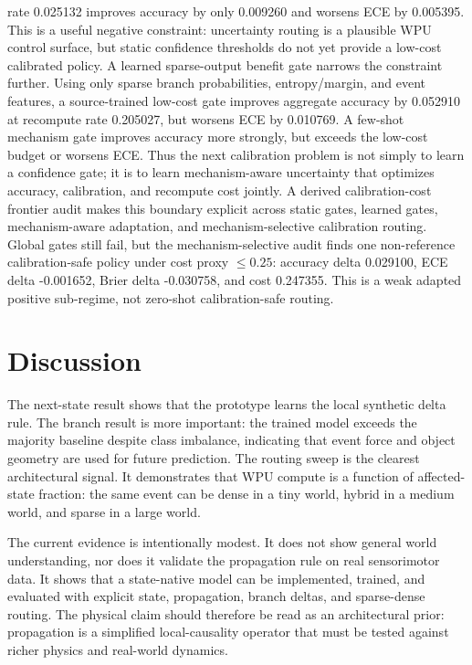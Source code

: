 \documentclass[11pt]{article}
\begin{document}
rate 0.025132 improves accuracy by only 0.009260 and worsens ECE by 0.005395.
This is a useful negative constraint: uncertainty routing is a plausible WPU
control surface, but static confidence thresholds do not yet provide a
low-cost calibrated policy.
A learned sparse-output benefit gate narrows the constraint further. Using only
sparse branch probabilities, entropy/margin, and event features, a source-trained
low-cost gate improves aggregate accuracy by 0.052910 at recompute rate
0.205027, but worsens ECE by 0.010769. A few-shot mechanism gate improves
accuracy more strongly, but exceeds the low-cost budget or worsens ECE. Thus the
next calibration problem is not simply to learn a confidence gate; it is to learn
mechanism-aware uncertainty that optimizes accuracy, calibration, and recompute
cost jointly.
A derived calibration-cost frontier audit makes this boundary explicit across
static gates, learned gates, mechanism-aware adaptation, and mechanism-selective
calibration routing. Global gates still fail, but the mechanism-selective audit
finds one non-reference calibration-safe policy under cost proxy $\leq 0.25$:
accuracy delta 0.029100, ECE delta -0.001652, Brier delta -0.030758, and cost
0.247355. This is a weak adapted positive sub-regime, not zero-shot
calibration-safe routing.

\section{Discussion}

The next-state result shows that the prototype learns the local synthetic delta
rule. The branch result is more important: the trained model exceeds the
majority baseline despite class imbalance, indicating that event force and
object geometry are used for future prediction. The routing sweep is the
clearest architectural signal. It demonstrates that WPU compute is a function of
affected-state fraction: the same event can be dense in a tiny world, hybrid in
a medium world, and sparse in a large world.

The current evidence is intentionally modest. It does not show general world
understanding, nor does it validate the propagation rule on real sensorimotor
data. It shows that a state-native model can be implemented, trained, and
evaluated with explicit state, propagation, branch deltas, and sparse-dense
routing. The physical claim should therefore be read as an architectural prior:
propagation is a simplified local-causality operator that must be tested against
richer physics and real-world dynamics.
\end{document}

